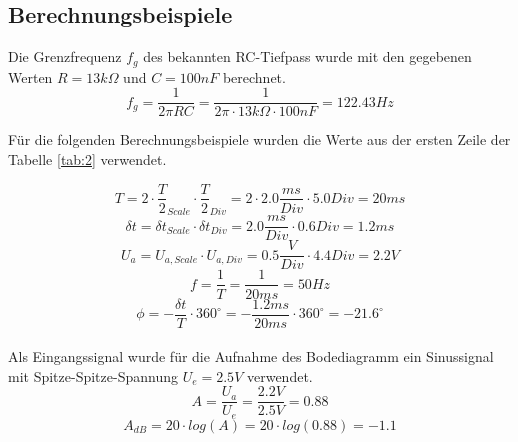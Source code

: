 \documentclass[12pt,a4paper,ngerman]{article}
\begin{document}
\subsection{Berechnungsbeispiele}
Die Grenzfrequenz $f_g$ des bekannten RC-Tiefpass wurde mit den gegebenen Werten $R = 13k\Omega$ und $C = 100 nF$ berechnet.
\begin{equation}
f_g = \frac{1}{2 \pi RC} = \frac{1}{2 \pi \cdot 13k\Omega \cdot 100nF} = 122.43Hz
\end{equation}

Für die folgenden Berechnungsbeispiele wurden die Werte aus der ersten Zeile der Tabelle \ref{tab:2} verwendet.

\begin{equation}
T = 2 \cdot \frac{T}{2}_{Scale} \cdot \frac{T}{2}_{Div} = 2 \cdot 2.0\frac{ms}{Div} \cdot 5.0 Div = 20ms
\end{equation}
\begin{equation}
\delta t = \delta t_{Scale} \cdot \delta t_{Div} = 2.0\frac{ms}{Div} \cdot 0.6Div = 1.2ms
\end{equation}
\begin{equation}
U_a = U_{a,Scale} \cdot U_{a,Div} = 0.5\frac{V}{Div} \cdot 4.4Div = 2.2V
\end{equation}
\begin{equation}
f = \frac{1}{T} = \frac{1}{20ms} = 50Hz
\end{equation}
\begin{equation}
\phi = - \frac{\delta t}{T} \cdot 360^\circ = -\frac{1.2ms}{20ms	} \cdot 360^\circ = -21.6^\circ
\end{equation}\\
Als Eingangssignal wurde für die Aufnahme des Bodediagramm ein Sinussignal mit Spitze-Spitze-Spannung $U_e = 2.5V$ verwendet.
\begin{equation}
A = \frac{U_a}{U_e} = \frac{2.2V}{2.5V} = 0.88
\end{equation}
\begin{equation}
A_{dB} = 20 \cdot log(A) = 20 \cdot log(0.88) = -1.1
\end{equation}
\end{document}
